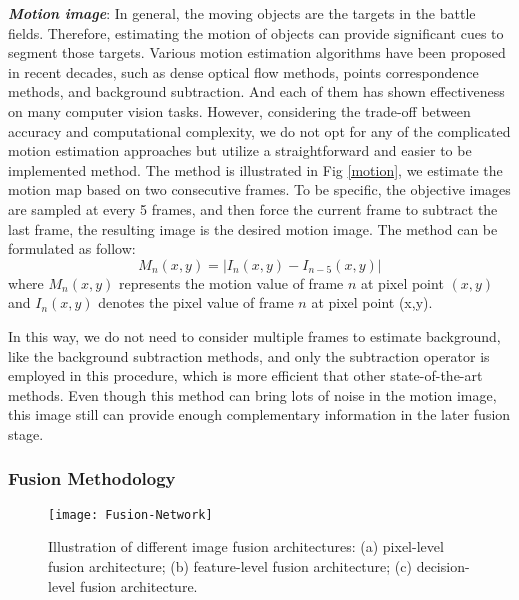 \documentclass[journal]{IEEEtran}
\begin{document}
\textit{\textbf{Motion image}}: In general, the moving objects are the targets in the battle fields. Therefore, estimating the motion of objects can provide significant cues to segment those targets.  Various motion estimation algorithms have been proposed in recent decades, such as dense optical flow methods, points correspondence methods, and background subtraction. And each of them has shown effectiveness on many computer vision tasks. However, considering the trade-off between accuracy and computational complexity, we do not opt for any of the complicated motion estimation approaches but utilize a straightforward and easier to be implemented method. The method is illustrated in Fig \ref{motion}, we estimate the motion map based on two consecutive frames. To be specific, the objective images are sampled at every 5 frames, and then force the current frame to subtract the last frame, the resulting image is the desired motion image. The method can be formulated as follow:
\begin{equation}
M_n(x,y) = | I_n(x,y) - I_{n-5}(x,y)|
\end{equation}
where $M_n(x,y)$ represents the motion value of frame $n$ at pixel point $(x,y)$ and $I_n(x,y)$ denotes the pixel value of frame $n$ at pixel point (x,y).

In this way, we do not need to consider multiple frames to estimate background, like the background subtraction methods, and only the subtraction operator is employed in this procedure, which is more efficient that other state-of-the-art methods. Even though this method can bring lots of noise in the motion image, this image still can provide enough complementary information in the later fusion stage.

\subsubsection{Fusion Methodology}

\begin{figure*}[ht]
\texttt{[image: Fusion-Network]}
 \centering
 \caption{Illustration of different image fusion architectures: (a) pixel-level fusion architecture; (b) feature-level fusion architecture; (c) decision-level fusion architecture. }
 \label{fusion_configurations}
\end{figure*}
\end{document}

